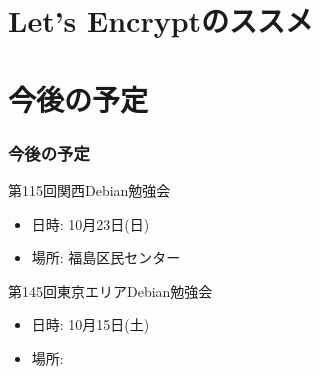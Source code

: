 \documentclass[cjk,dvipdfmx,10pt,compress,%
hyperref={bookmarks=true,bookmarksnumbered=true,bookmarksopen=false,%
colorlinks=false,%
pdftitle={第 114 回 関西 Debian 勉強会},%
pdfauthor={倉敷・のがた・佐々木・かわだ},%
pdfsubject={資料},%
}]{beamer}
\begin{document}

\section{Let's Encryptのススメ}


\section{今後の予定}
\begin{frame}[fragile]
  \frametitle{今後の予定}

  \begin{block}{第115回関西Debian勉強会}
    \begin{itemize}
    \item 日時: 10月23日(日)
    \item 場所: 福島区民センター
    \end{itemize}
  \end{block}

  \begin{block}{第145回東京エリアDebian勉強会}
    \begin{itemize}
    \item 日時: 10月15日(土)
    \item 場所:
    \end{itemize}
  \end{block}

\end{frame}

\takahashi[50]{  }
\end{document}
